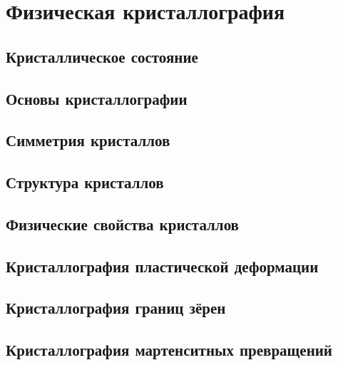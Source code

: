 \chapter{Физическая кристаллография}\label{ch:cryst}


\section{Кристаллическое состояние}\label{sec:cryst-state}


\section{Основы кристаллографии}\label{sec:cryst-basics}




\section{Симметрия кристаллов}\label{sec:symmetry}



\section{Структура кристаллов}\label{sec:structure}


\section{Физические свойства кристаллов}\label{sec:properties}

\section{Кристаллография пластической деформации}\label{sec:plastic}

\section{Кристаллография границ зёрен}\label{sec:boundaries}

\section{Кристаллография мартенситных превращений}\label{sec:martensite}


